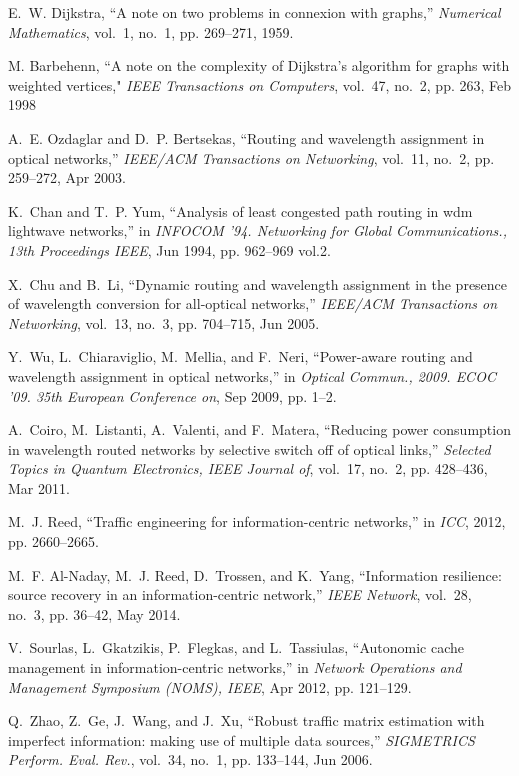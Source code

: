\documentclass[journal]{IEEEtran}
\begin{document}
\begin{thebibliography}{45}
E.~W. Dijkstra, ``A note on two problems in connexion with graphs,''
 \emph{Numerical Mathematics}, vol.~1, no.~1, pp. 269--271, 1959.
 
 M. Barbehenn, ``A note on the complexity of Dijkstra's algorithm for graphs with weighted vertices," 
 \emph{IEEE Transactions on Computers}, vol.~47, no.~2, pp. 263, Feb 1998

A.~E. Ozdaglar and D.~P. Bertsekas, ``Routing and wavelength assignment in
 optical networks,'' \emph{IEEE/ACM Transactions on Networking}, vol.~11,
 no.~2, pp. 259--272, Apr 2003.

K.~Chan and T.~P. Yum, ``Analysis of least congested path routing in wdm
 lightwave networks,'' in \emph{INFOCOM '94. Networking for Global
 Communications., 13th Proceedings IEEE}, Jun 1994, pp. 962--969 vol.2.

X.~Chu and B.~Li, ``Dynamic routing and wavelength assignment in the presence
 of wavelength conversion for all-optical networks,'' \emph{IEEE/ACM
 Transactions on Networking}, vol.~13, no.~3, pp. 704--715, Jun 2005.

Y.~Wu, L.~Chiaraviglio, M.~Mellia, and F.~Neri, ``Power-aware routing and
 wavelength assignment in optical networks,'' in \emph{Optical Commun.,
 2009. ECOC '09. 35th European Conference on}, Sep 2009, pp. 1--2.

A.~Coiro, M.~Listanti, A.~Valenti, and F.~Matera, ``Reducing power consumption
 in wavelength routed networks by selective switch off of optical links,''
 \emph{Selected Topics in Quantum Electronics, IEEE Journal of}, vol.~17,
 no.~2, pp. 428--436, Mar 2011.



M.~J. Reed, ``Traffic engineering for information-centric networks,'' in
 \emph{ICC}, 2012, pp. 2660--2665.

M.~F. Al-Naday, M.~J. Reed, D.~Trossen, and K.~Yang, ``Information resilience:
 source recovery in an information-centric network,'' \emph{IEEE Network},
 vol.~28, no.~3, pp. 36--42, May 2014.

V.~Sourlas, L.~Gkatzikis, P.~Flegkas, and L.~Tassiulas, ``Autonomic cache
 management in information-centric networks,'' in \emph{Network Operations and
 Management Symposium (NOMS), IEEE}, Apr 2012, pp. 121--129.

Q.~Zhao, Z.~Ge, J.~Wang, and J.~Xu, ``Robust traffic matrix estimation with
 imperfect information: making use of multiple data sources,''
 \emph{SIGMETRICS Perform. Eval. Rev.}, vol.~34, no.~1, pp. 133--144, Jun
 2006.


\end{thebibliography}
\end{document}
